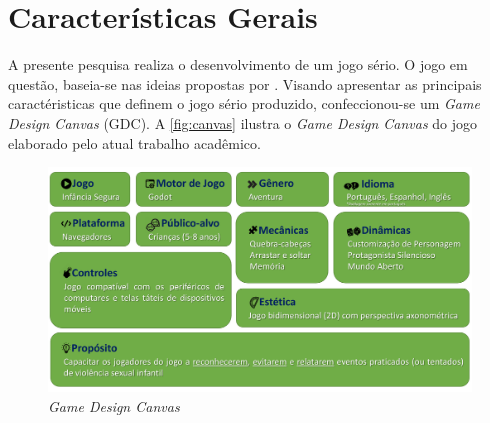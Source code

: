 \section{Características Gerais}\label{sec:motor}

A presente pesquisa realiza o desenvolvimento de um jogo sério. O jogo em questão, baseia-se nas ideias propostas por . Visando apresentar as principais caractéristicas que definem o jogo sério produzido, confeccionou-se um \textit{Game Design Canvas} (GDC). A \autoref{fig:canvas} ilustra o \textit{Game Design Canvas} do jogo elaborado pelo atual trabalho acadêmico. 


\vspace{-0.1cm}

\begin{figure}[hbt!]
  \caption{\label{fig:canvas}\textit{Game Design Canvas}}\vspace{-0.45cm}
  \begin{center}
    \includegraphics[width=\linewidth]{./Figuras/canvas.pdf}
    \end{center}\vspace{-0.8cm}
\end{figure}

